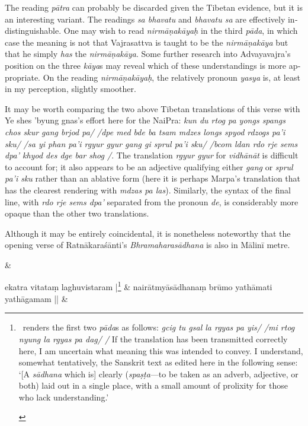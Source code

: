 \documentclass[naipra.tex]{subfiles}
\begin{document}
\begin{sanskrit}
{\begin{english}
		The reading \emph{pātra} can probably be discarded given the Tibetan evidence, but it is an interesting variant.
		The readings \emph{sa bhavatu} and \emph{bhavatu sa} are effectively indistinguishable.
		One may wish to read \emph{nirmāṇakāyaḥ} in the third \emph{pāda}, in which case the meaning is not that Vajrasattva is taught to be the \emph{nirmāṇakāya} but that he simply \emph{has} the \emph{nirmāṇakāya}.
		Some further research into Advayavajra's position on the three \emph{kāya}s may reveal which of these understandings is more appropriate.
		On the reading \emph{nirmāṇakāyaḥ}, the relatively pronoun \emph{yasya} is, at least in my perception, slightly smoother.

		It may be worth comparing the two above Tibetan translations of this verse with Ye shes 'byung gnas's effort here for the NaiPra: \emph{kun du rtog pa yongs spangs chos skur gang brjod pa/ /dpe med bde ba tsam mdzes longs spyod rdzogs pa'i sku/ /sa yi phan pa'i rgyur gyur gang gi sprul pa'i sku/ /bcom ldan rdo rje sems dpa' khyod des dge bar shog /}. 
		The translation \emph{rgyur gyur} for \emph{vidhānāt} is difficult to account for; it also appears to be an adjective qualifying either \emph{gang} or \emph{sprul pa'i sku} rather than an ablative form (here it is perhaps Marpa's translation that has the clearest rendering with \emph{mdzas pa las}).
		Similarly, the syntax of the final line, with \emph{rdo rje sems dpa'} separated from the pronoun \emph{de}, is considerably more opaque than the other two translations.

		Although it may be entirely coincidental, it is nonetheless noteworthy that the opening verse of Ratnākaraśānti's \emph{Bhramaharasādhana} is also in Mālinī metre.
	\end{english}
} \&



\medskip\versequote
ekatra vitataṃ laghuvistaram |\footnote{
	\begin{english}%
		\TIB\ renders the first two \emph{pāda}s as follows: \emph{gcig tu gsal la rgyas pa yis/ /mi rtog nyung la rgyas pa dag/ /}
		If the translation has been transmitted correctly here, I am uncertain what meaning this was intended to convey. 
		I understand, somewhat tentatively, the Sanskrit text as edited here in the following sense: `[A \emph{sādhana} which is] clearly (\emph{spaṣṭa}—to be taken as an adverb, adjective, or both) laid out in a single place, with a small amount of prolixity for those who lack understanding.'
	\end{english}
} & 
nairātmyāsādhanaṃ brūmo yathāmati yathāgamam || \&


\end{sanskrit}
\end{document}
